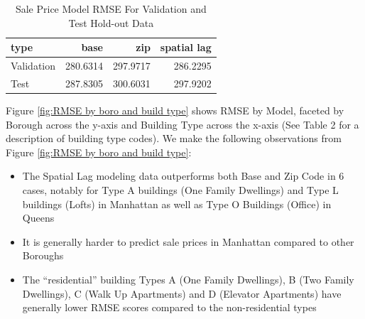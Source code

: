 \documentclass[12pt,]{article}
\providecommand{\tightlist}{%
  \setlength{\itemsep}{0pt}\setlength{\parskip}{0pt}}
\begin{document}
\begin{table}

\caption{\label{tab:Sale Price Evaluations}\label{tab:SalePriceEval} Sale Price Model RMSE For Validation and Test Hold-out Data}
\centering
\begin{tabular}[t]{lrrr}
\toprule
type & base & zip & spatial lag\\
\midrule
Validation & 280.6314 & 297.9717 & 286.2295\\
Test & 287.8305 & 300.6031 & 297.9202\\
\bottomrule
\end{tabular}
\end{table}

Figure \ref{fig:RMSE by boro and build type} shows RMSE by Model,
faceted by Borough across the y-axis and Building Type across the x-axis
(See Table 2 for a description of building type codes). We make the
following observations from Figure
\ref{fig:RMSE by boro and build type}:

\begin{itemize}
\tightlist
\item
  The Spatial Lag modeling data outperforms both Base and Zip Code in 6
  cases, notably for Type A buildings (One Family Dwellings) and Type L
  buildings (Lofts) in Manhattan as well as Type O Buildings (Office) in
  Queens
\item
  It is generally harder to predict sale prices in Manhattan compared to
  other Boroughs
\item
  The ``residential'' building Types A (One Family Dwellings), B (Two
  Family Dwellings), C (Walk Up Apartments) and D (Elevator Apartments)
  have generally lower RMSE scores compared to the non-residential types
\end{itemize}
\end{document}
